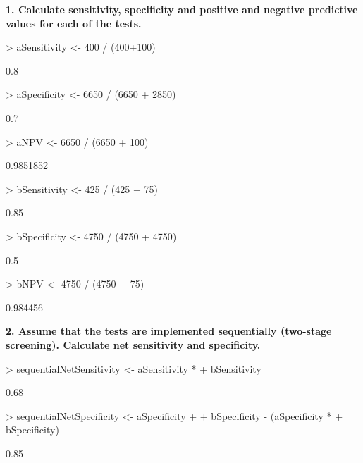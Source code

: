 \documentclass[12pt]{article}
\begin{document}
\noindent \textbf{1. Calculate sensitivity, specificity and positive and negative predictive values for each of the tests.}

\begin{multicols}{2}

\begin{Schunk}
\begin{Sinput}
> aSensitivity <- 400 / (400+100)
\end{Sinput}
\begin{Soutput}
[1] 0.8
\end{Soutput}
\begin{Sinput}
> aSpecificity <- 6650 / (6650 + 2850)
\end{Sinput}
\begin{Soutput}
[1] 0.7
\end{Soutput}
\begin{Sinput}
> aNPV <- 6650 / (6650 + 100)
\end{Sinput}
\begin{Soutput}
[1] 0.9851852
\end{Soutput}
\end{Schunk}



\columbreak
\begin{Schunk}
\begin{Sinput}
> bSensitivity <- 425 / (425 + 75)
\end{Sinput}
\begin{Soutput}
[1] 0.85
\end{Soutput}
\begin{Sinput}
> bSpecificity <- 4750 / (4750 + 4750)
\end{Sinput}
\begin{Soutput}
[1] 0.5
\end{Soutput}
\begin{Sinput}
> bNPV <- 4750 / (4750 + 75)
\end{Sinput}
\begin{Soutput}
[1] 0.984456
\end{Soutput}
\end{Schunk}
\end{multicols}

\noindent \textbf{2. Assume that the tests are implemented sequentially (two-stage screening).  Calculate net sensitivity and specificity. }

\begin{Schunk}
\begin{Sinput}
> sequentialNetSensitivity <- aSensitivity * 
+     bSensitivity
\end{Sinput}
\begin{Soutput}
[1] 0.68
\end{Soutput}
\begin{Sinput}
> sequentialNetSpecificity <- aSpecificity + 
+     bSpecificity - (aSpecificity * 
+     bSpecificity)
\end{Sinput}
\begin{Soutput}
[1] 0.85
\end{Soutput}
\end{Schunk}
\end{document}
